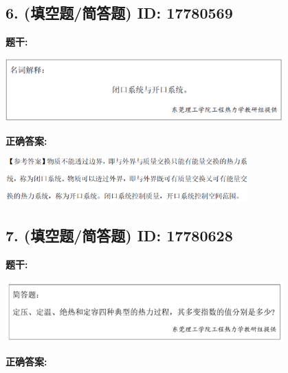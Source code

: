 \documentclass[12pt]{article}
\begin{document}
\vspace{0.5em}\hrulefill\vspace{1em}

\subsection*{6. (填空题/简答题) \small ID: 17780569}

\textbf{题干:}


\begin{center}\includegraphics[width=0.8\textwidth, height=0.25\textheight, keepaspectratio]{question_6_17780569/title_img_1.png}\end{center}

\textbf{正确答案:}

\begin{center}\includegraphics[width=0.7\textwidth, height=0.2\textheight, keepaspectratio]{question_6_17780569/correct_answer_1_img_1.png}\end{center}

\vspace{0.5em}\hrulefill\vspace{1em}

\subsection*{7. (填空题/简答题) \small ID: 17780628}

\textbf{题干:}


\begin{center}\includegraphics[width=0.8\textwidth, height=0.25\textheight, keepaspectratio]{question_7_17780628/title_img_1.png}\end{center}

\textbf{正确答案:}
\end{document}
